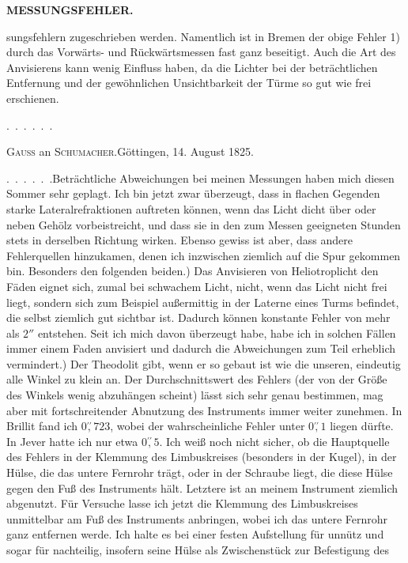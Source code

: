 \par\clearpage
\noindent\null\hfill{\small\textbf{MESSUNGSFEHLER.}}\hfill{}\par\medskip
\noindent sungsfehlern zugeschrieben werden. Namentlich ist in Bremen der obige Fehler 1) durch das Vorwärts- und Rückwärtsmessen fast ganz beseitigt. Auch die Art des Anvisierens kann wenig Einfluss haben, da die Lichter bei der beträchtlichen Entfernung und der gewöhnlichen Unsichtbarkeit der Türme so gut wie frei erschienen.\par
\noindent .\ .\ .\ .\ .\ .
\begin{center}{\large\textsc{Gauss} an \textsc{Schumacher}.\quad Göttingen, 14. August 1825.}\end{center}
\par\noindent\hspace*{\parindent}.\ .\ .\ .\ .\ .\enspace Beträchtliche Abweichungen bei meinen Messungen haben mich diesen Sommer sehr geplagt. Ich bin jetzt zwar überzeugt, dass in flachen Gegenden starke Lateralrefraktionen auftreten können, wenn das Licht dicht über oder neben Gehölz vorbeistreicht, und dass sie in den zum Messen geeigneten Stunden stets in derselben Richtung wirken. Ebenso gewiss ist aber, dass andere Fehlerquellen hinzukamen, denen ich inzwischen ziemlich auf die Spur gekommen bin. Besonders den folgenden beiden.) Das Anvisieren von Heliotroplicht  den Fäden eignet sich, zumal bei schwachem Licht, nicht, wenn das Licht nicht frei liegt, sondern sich zum Beispiel außermittig in der Laterne eines Turms befindet, die selbst ziemlich gut sichtbar ist. Dadurch können konstante Fehler von mehr als $2''$ entstehen. Seit ich mich davon überzeugt habe, habe ich in solchen Fällen immer  einem Faden anvisiert und dadurch die Abweichungen zum Teil erheblich vermindert.) Der Theodolit gibt, wenn er so gebaut ist wie die unseren, eindeutig alle Winkel zu klein an. Der Durchschnittswert des Fehlers (der von der Größe des Winkels wenig abzuhängen scheint) lässt sich sehr genau bestimmen, mag aber mit fortschreitender Abnutzung des Instruments immer weiter zunehmen. In Brillit fand ich $0\overset{\prime\prime}{,}723$, wobei der wahrscheinliche Fehler unter $0\overset{\prime\prime}{,}1$ liegen dürfte. In Jever hatte ich nur etwa $0\overset{\prime\prime}{,}5$. Ich weiß noch nicht sicher, ob die Hauptquelle des Fehlers in der Klemmung des Limbuskreises (besonders in der Kugel), in der Hülse, die das untere Fernrohr trägt, oder in der Schraube liegt, die diese Hülse gegen den Fuß des Instruments hält. Letztere ist an meinem Instrument ziemlich abgenutzt. Für Versuche lasse ich jetzt die Klemmung des Limbuskreises unmittelbar am Fuß des Instruments anbringen, wobei ich das untere Fernrohr ganz entfernen werde. Ich halte es bei einer festen Aufstellung für unnütz und sogar für nachteilig, insofern seine Hülse als Zwischenstück zur Befestigung des

